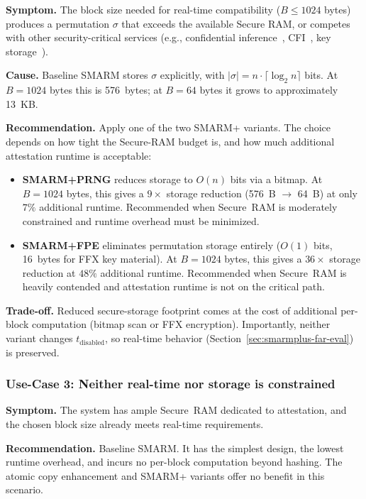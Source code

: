 \documentclass[a4paper,10pt]{article}
\begin{document}
{\textbf{Symptom.} The block size needed for real-time 
compatibility ($B \leq 1024$ bytes) produces a permutation 
$\sigma$ that exceeds the available Secure RAM, or competes with 
other security-critical services (e.g., confidential 
inference~\cite{islam2023confidential}, 
CFI~\cite{kawada2021tzmcfi}, key 
storage~\cite{silabs2020an1271}).

\textbf{Cause.} Baseline SMARM stores $\sigma$ explicitly, with 
$|\sigma| = n \cdot \lceil \log_2 n \rceil$ bits. At 
$B = 1024$ bytes this is 576~bytes; at $B = 64$ bytes it grows 
to approximately 13~KB.

\textbf{Recommendation.} Apply one of the two SMARM+ variants. 
The choice depends on how tight the Secure-RAM budget is, and 
how much additional attestation runtime is acceptable:

\begin{itemize}
    \item \textbf{SMARM+PRNG} reduces storage to 
    $O(n)$ bits via a bitmap. At $B = 1024$ bytes, this gives a 
    $9\times$ storage reduction (576~B $\rightarrow$ 64~B) at 
    only $7\%$ additional runtime. Recommended when 
    Secure~RAM is moderately constrained and runtime overhead 
    must be minimized.
    
    \item \textbf{SMARM+FPE} eliminates 
    permutation storage entirely ($O(1)$ bits, 16~bytes for 
    FFX key material). At $B = 1024$ bytes, this gives a 
    $36\times$ storage reduction at $48\%$ additional 
    runtime. Recommended when Secure~RAM is heavily contended 
    and attestation runtime is not on the critical path.
\end{itemize}

\textbf{Trade-off.} Reduced secure-storage footprint comes at 
the cost of additional per-block computation (bitmap scan or 
FFX encryption). Importantly, neither variant changes 
$t_{\mathrm{disabled}}$, so real-time behavior 
(Section~\ref{sec:smarmplus-far-eval}) is preserved.

\subsubsection{Use-Case 3: Neither real-time nor storage is constrained}

\textbf{Symptom.} The system has ample Secure~RAM dedicated to 
attestation, and the chosen block size already meets real-time 
requirements.

\textbf{Recommendation.} Baseline SMARM. It has the simplest 
design, the lowest runtime overhead, and incurs no per-block 
computation beyond hashing. The atomic copy enhancement and 
SMARM+ variants offer no benefit in this scenario.

}
\end{document}
